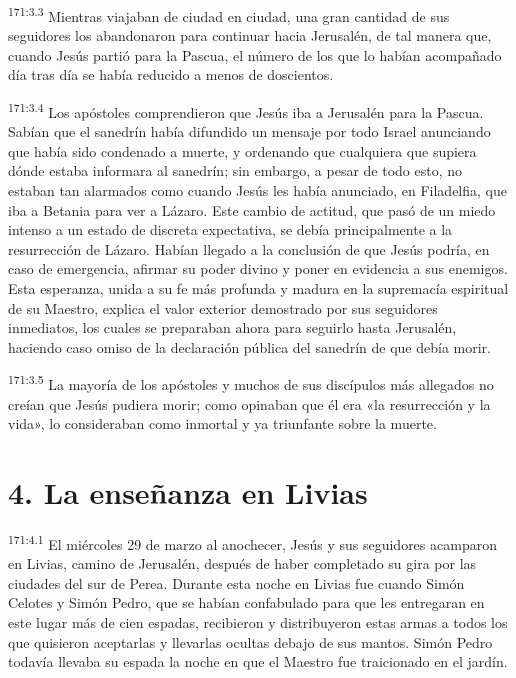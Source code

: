 \par 
\textsuperscript{171:3.3} Mientras viajaban de ciudad en ciudad, una gran cantidad de sus seguidores los abandonaron para continuar hacia Jerusalén, de tal manera que, cuando Jesús partió para la Pascua, el número de los que lo habían acompañado día tras día se había reducido a menos de doscientos.

\par 
\textsuperscript{171:3.4} Los apóstoles comprendieron que Jesús iba a Jerusalén para la Pascua. Sabían que el sanedrín había difundido un mensaje por todo Israel anunciando que había sido condenado a muerte, y ordenando que cualquiera que supiera dónde estaba informara al sanedrín; sin embargo, a pesar de todo esto, no estaban tan alarmados como cuando Jesús les había anunciado, en Filadelfia, que iba a Betania para ver a Lázaro. Este cambio de actitud, que pasó de un miedo intenso a un estado de discreta expectativa, se debía principalmente a la resurrección de Lázaro. Habían llegado a la conclusión de que Jesús podría, en caso de emergencia, afirmar su poder divino y poner en evidencia a sus enemigos. Esta esperanza, unida a su fe más profunda y madura en la supremacía espiritual de su Maestro, explica el valor exterior demostrado por sus seguidores inmediatos, los cuales se preparaban ahora para seguirlo hasta Jerusalén, haciendo caso omiso de la declaración pública del sanedrín de que debía morir.

\par 
\textsuperscript{171:3.5} La mayoría de los apóstoles y muchos de sus discípulos más allegados no creían que Jesús pudiera morir; como opinaban que él era «la resurrección y la vida», lo consideraban como inmortal y ya triunfante sobre la muerte.

\section*{4. La enseñanza en Livias}
\par 
\textsuperscript{171:4.1} El miércoles 29 de marzo al anochecer, Jesús y sus seguidores acamparon en Livias, camino de Jerusalén, después de haber completado su gira por las ciudades del sur de Perea. Durante esta noche en Livias fue cuando Simón Celotes y Simón Pedro, que se habían confabulado para que les entregaran en este lugar más de cien espadas, recibieron y distribuyeron estas armas a todos los que quisieron aceptarlas y llevarlas ocultas debajo de sus mantos. Simón Pedro todavía llevaba su espada la noche en que el Maestro fue traicionado en el jardín.

